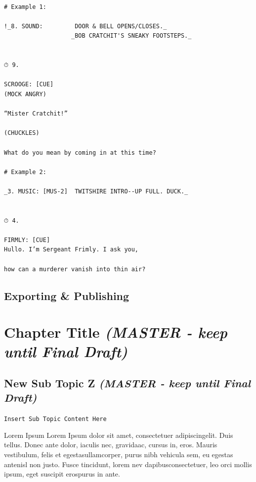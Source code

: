 \documentclass[openleft,oneside,showtrims]{memoir}
\begin{document}
\lstset{language=fountain,label= ,caption= ,captionpos=b,numbers=none}
\begin{lstlisting}

# Example 1:

!_8. SOUND:         DOOR & BELL OPENS/CLOSES._
                   _BOB CRATCHIT'S SNEAKY FOOTSTEPS._


⏱ 9.

SCROOGE: [CUE]
(MOCK ANGRY)
  
“Mister Cratchit!”
  
(CHUCKLES)
  
What do you mean by coming in at this time?

# Example 2:

_3. MUSIC: [MUS-2]  TWITSHIRE INTRO--UP FULL. DUCK._


⏱ 4.

FIRMLY: [CUE]
Hullo. I’m Sergeant Frimly. I ask you,
  
how can a murderer vanish into thin air?

\end{lstlisting}



\section{Exporting \& Publishing}
\label{sec:orgb1b1cee}

\chapter{Chapter Title \emph{(MASTER - keep until Final Draft)}}
\label{sec:org313c28f}
\label{CHAPTER_chapter-title}

\section{New Sub Topic Z \emph{(MASTER - keep until Final Draft)}}
\label{sec:orgda1c08d}
\label{TOPIC_new-sub-topic-z}
\texttt{Insert Sub Topic Content Here}

Lorem Ipsum Lorem Ipsum dolor sit amet, consectetuer adipiscingelit. Duis tellus. Donec ante dolor, iaculis nec, gravidaac, cursus in, eros. Mauris vestibulum, felis et egestasullamcorper, purus nibh vehicula sem, eu egestas antenisl non justo. Fusce tincidunt, lorem nev dapibusconsectetuer, leo orci mollis ipsum, eget suscipit erospurus in ante.
\end{document}
